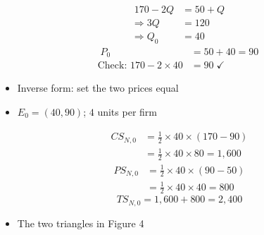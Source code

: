 \documentclass{beamer}
\begin{document}
\begin{frame}[plain,label=w2_wt3_equilibrium]
  \Large
  \begin{align*}
    \tag{7}\;170 - 2Q &= 50 + Q\\
    \Rightarrow 3Q &= 120\\
    \Rightarrow Q_0 &= 40
  \end{align*}
  \begin{align*}
    \tag{8}\;P_0 &= 50 + 40 = 90\\
    \text{Check: } 170 - 2 \times 40 &= 90 \;\checkmark
  \end{align*}

  \vspace{0.3em}
  \begin{itemize}\Large
    \item Inverse form: set the two prices equal
    \item $E_0 = (40, 90)$; $4$ units per firm
  \end{itemize}
\end{frame}

\begin{frame}[plain,label=w2_wt3_welfare]
  \Large
  \begin{align*}
    \tag{9}\;CS_{N,0} &= \tfrac{1}{2} \times 40 \times (170 - 90)\\
                     &= \tfrac{1}{2} \times 40 \times 80 = 1{,}600
  \end{align*}
  \begin{align*}
    \tag{10}\;PS_{N,0} &= \tfrac{1}{2} \times 40 \times (90 - 50)\\
                      &= \tfrac{1}{2} \times 40 \times 40 = 800
  \end{align*}
  \[
    \tag{11}\;TS_{N,0} = 1{,}600 + 800 = 2{,}400
  \]

  \vspace{0.3em}
  \begin{itemize}\Large
    \item The two triangles in Figure 4
  \end{itemize}
\end{frame}
\end{document}

